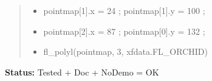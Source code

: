 \begin{boxedminipage}{\funcwidth}
\begin{quote}
\begin{itemize}
  \item pointmap[1].x = 24 ; pointmap[1].y = 100 ;



  \item pointmap[2].x = 87 ; pointmap[0].y = 132 ;



  \item fl\_polyl(pointmap, 3, xfdata.FL\_ORCHID)



\end{itemize}

\end{quote}

\textbf{Status:} Tested + Doc + NoDemo = OK



    \end{boxedminipage}

    \label{xformslib:flxbasic:fl_polybound}

    \vspace{0.5ex}

